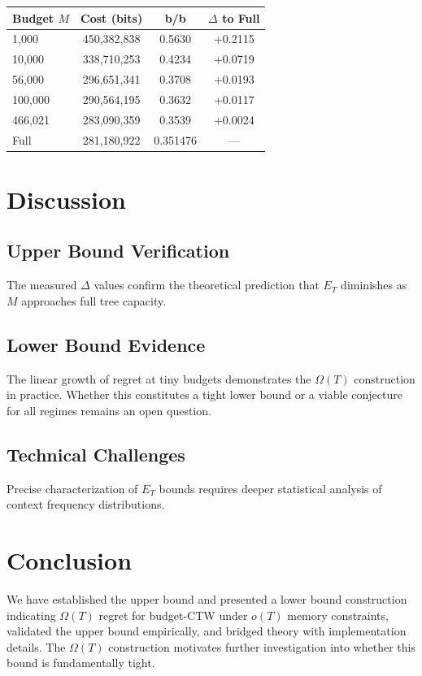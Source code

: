 \documentclass[11pt]{article}
\begin{document}
\begin{longtable}{lccc}
\toprule
Budget $M$ & Cost (bits) & b/b & $\Delta$ to Full \\
\midrule
1,000 & 450,382,838 & 0.5630 & +0.2115 \\
10,000 & 338,710,253 & 0.4234 & +0.0719 \\
56,000 & 296,651,341 & 0.3708 & +0.0193 \\
100,000 & 290,564,195 & 0.3632 & +0.0117 \\
466,021 & 283,090,359 & 0.3539 & +0.0024 \\
Full & 281,180,922 & 0.351476 & — \\
\bottomrule
\end{longtable}

\section{Discussion}
\label{sec:discussion}
\subsection{Upper Bound Verification}
The measured $\Delta$ values confirm the theoretical prediction that $E_T$ diminishes as $M$ approaches full tree capacity.

\subsection{Lower Bound Evidence}
The linear growth of regret at tiny budgets demonstrates the $\Omega(T)$ construction in practice. Whether this constitutes a tight lower bound or a viable conjecture for all regimes remains an open question.

\subsection{Technical Challenges}
Precise characterization of $E_T$ bounds requires deeper statistical analysis of context frequency distributions.

\section{Conclusion}
We have established the upper bound and presented a lower bound construction indicating $\Omega(T)$ regret for budget-CTW under $o(T)$ memory constraints, validated the upper bound empirically, and bridged theory with implementation details. The $\Omega(T)$ construction motivates further investigation into whether this bound is fundamentally tight.
\end{document}
